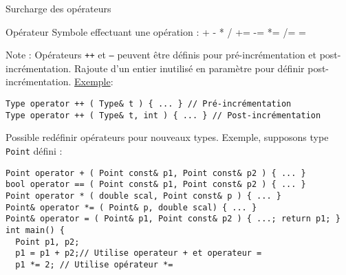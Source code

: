 \documentclass[compress,10pt,aspectratio=169]{beamer}
\begin{document}
\begin{frame}[fragile]{Surcharge des opérateurs}
    \scriptsize

\vspace*{-3mm}
\begin{block}{\small Opérateur}
Symbole effectuant une opération :  \verb@+ - * / += -= *= /= = % ++ -- & && | || &= |= ^ < <= == >= > != , [] () ~ ->@
\end{block}
  
\alert{Note} : Opérateurs \texttt{++} et \texttt{--} peuvent être définis pour  pré-incrémentation et post-incrémentation.
Rajoute d'un entier inutilisé en paramètre pour définir post-incrémentation. \underline{Exemple}:
\begin{verbatim}
Type operator ++ ( Type& t ) { ... } // Pré-incrémentation 
Type operator ++ ( Type& t, int ) { ... } // Post-incrémentation
\end{verbatim}

Possible redéfinir opérateurs pour nouveaux types. Exemple, supposons type \texttt{Point} défini :
\begin{verbatim}
Point operator + ( Point const& p1, Point const& p2 ) { ... }
bool operator == ( Point const& p1, Point const& p2 ) { ... }
Point operator * ( double scal, Point const& p ) { ... }
Point& operator *= ( Point& p, double scal) { ... }
Point& operator = ( Point& p1, Point const& p2 ) { ...; return p1; }
int main() {
  Point p1, p2;
  p1 = p1 + p2;// Utilise operateur + et operateur =
  p1 *= 2; // Utilise opérateur *=
\end{verbatim}
\end{frame}
\end{document}
